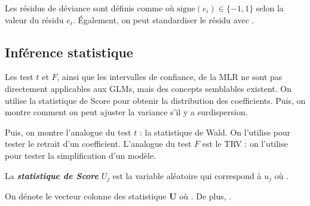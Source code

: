 \documentclass[french]{article}
\begin{document}
\begin{multicols*}{2}
\begin{definitionNOHFILL}
Les résidus de déviance sont définis comme  où $\text{signe}(e_{i}) \in \{-1, 1\}$ selon la valeur du résidu $e_{i}$. Également, on peut standardiser le résidu avec .
\end{definitionNOHFILL}



\columnbreak
\subsection{Inférence statistique}
\begin{rappel_enhanced}[Contexte]
Les test $t$ et $F$, ainsi que les intervalles de confiance, de la MLR ne sont pas directement applicables aux GLMs, mais des concepts semblables existent. On utilise la statistique de Score pour obtenir la distribution des coefficients. Puis, on montre comment on peut ajuster la variance s'il y a surdispersion. 

\bigskip

Puis, on montre l'analogue du test $t$ : la statistique de Wald. On l'utilise pour tester le retrait d'un coefficient. L'analogue du test $F$ est le TRV : on l'utilise pour tester la simplification d'un modèle. 
\end{rappel_enhanced}

\begin{definitionNOHFILL}
La \textbf{\textit{statistique de Score}} $U_{j}$ est la variable aléatoire qui correspond à $u_{j}$ où . 

\bigskip

On dénote le vecteur colonne des statistique $\bm{U}$ où . De plus, .
\end{definitionNOHFILL}


\end{multicols*}
\end{document}
